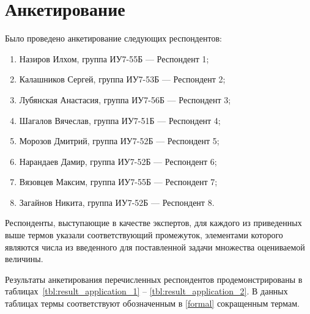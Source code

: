 \section{Анкетирование}

Было проведено анкетирование следующих респондентов:
\begin{enumerate}[label=\arabic*)]
	\item Назиров Илхом, группа ИУ7-55Б --- Респондент 1;
	\item Калашников Сергей, группа ИУ7-53Б --- Респондент 2;
	\item Лубянская Анастасия, группа ИУ7-56Б --- Респондент 3;
	\item Шагалов Вячеслав, группа ИУ7-51Б --- Респондент 4;
	\item Морозов Дмитрий, группа ИУ7-52Б --- Респондент 5;
	\item Нарандаев Дамир, группа ИУ7-52Б --- Респондент 6;
	\item Вязовцев Максим, группа ИУ7-55Б --- Респондент 7;
	\item Загайнов Никита, группа ИУ7-52Б --- Респондент 8.
\end{enumerate}

Респонденты, выступающие в качестве экспертов, для каждого из приведенных выше термов указали соответствующий промежуток, элементами которого являются числа из введенного для поставленной задачи множества оцениваемой величины.

Результаты анкетирования перечисленных респондентов продемонстрированы в таблицах~\ref{tbl:result_application_1} -- \ref{tbl:result_application_2}. В данных таблицах термы соответствуют обозначенным в \ref{formal} сокращенным термам.

\clearpage

